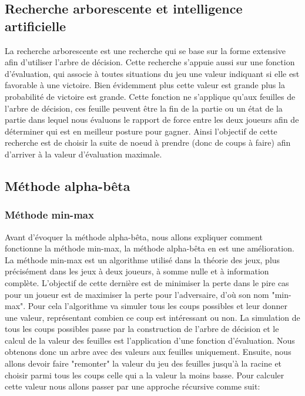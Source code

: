 \documentclass[12pt]{article}
\begin{document}
	\subsection{Recherche arborescente et intelligence artificielle}
    	La recherche arborescente est une recherche qui se base sur la forme extensive afin d'utiliser l'arbre de décision\cite{cours_arbre_decision}. Cette recherche s'appuie aussi sur une fonction d'évaluation, qui associe à toutes situations du jeu une valeur indiquant si elle est favorable à une victoire. Bien évidemment plus cette valeur est grande plus la probabilité de victoire est grande. Cette fonction ne s'applique qu'aux feuilles de l'arbre de décision, ces feuille peuvent être la fin de la partie ou un état de la partie dans lequel nous évaluons le rapport de force
    	entre les deux joueurs afin de déterminer qui est en meilleur posture pour gagner. Ainsi l'objectif de cette recherche est de choisir la suite de noeud à prendre (donc de coups à faire) afin d'arriver à la valeur d'évaluation maximale.

	\subsection{Méthode alpha-bêta}
	\subsubsection{Méthode min-max}
    	Avant d'évoquer la méthode alpha-bêta, nous allons expliquer comment fonctionne la méthode min-max,
    	la méthode alpha-bêta en est une amélioration. La méthode min-max est un algorithme utilisé dans la théorie des jeux, plus précisément dans les jeux à deux joueurs, à somme nulle et à information complète\cite{min_max}. L'objectif de cette dernière est de minimiser la perte dans le pire cas pour un joueur est de maximiser la perte pour l'adversaire, d'où son nom "min-max". Pour cela l'algorithme va simuler tous les coups possibles et leur donner une valeur, représentant combien ce coup est intéressant ou non. La simulation de tous les coups possibles passe par la construction de l'arbre de décision et le calcul de la valeur des feuilles est l'application d'une fonction d'évaluation. Nous obtenons donc un arbre avec des valeurs aux feuilles uniquement. Ensuite, nous allons devoir faire "remonter" la valeur du jeu des feuilles jusqu'à la racine et choisir parmi tous les coups celle qui a la valeur la moins basse. Pour calculer cette valeur nous allons passer par une approche récursive comme suit\cite{minimax_alog}:
	
\end{document}
